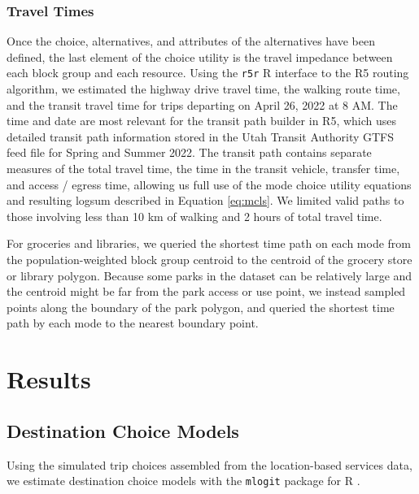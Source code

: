 \documentclass[ijerph,article,submit,moreauthors,pdftex]{mdpi}
\begin{document}
\hypertarget{travel-times}{%
\subsubsection{Travel Times}\label{travel-times}}

Once the choice, alternatives, and attributes of the alternatives have been
defined, the last element of the choice utility is the travel impedance between
each block group and each resource. Using the \texttt{r5r} R interface \citep{r5r} to the R5
routing algorithm, we estimated the highway drive travel time, the walking
route time, and the transit travel time for trips departing on April 26,
2022 at 8 AM. The time and date are most relevant for the transit path builder
in R5, which uses detailed transit path information stored in the
Utah Transit Authority GTFS feed file for Spring and Summer 2022. The transit path contains
separate measures of the total travel time, the time in the transit vehicle,
transfer time, and access / egress time, allowing us full use of the
mode choice utility equations and resulting logsum described in Equation \eqref{eq:mcls}.
We limited valid paths to those involving less than 10 km of walking and
2 hours of total travel time.

For groceries and libraries, we queried the shortest time path on each
mode from the population-weighted block group centroid to the centroid of the grocery
store or library polygon. Because some parks in the dataset can be relatively
large and the centroid might be far from the park access or use point, we instead
sampled points along the boundary of the park polygon, and queried the shortest
time path by each mode to the nearest boundary point.

\hypertarget{results}{%
\section{Results}\label{results}}

\hypertarget{destination-choice-models}{%
\subsection{Destination Choice Models}\label{destination-choice-models}}

Using the simulated trip choices assembled from the location-based services data,
we estimate destination choice models with the \texttt{mlogit} package for
R \citep{R, mlogit}.
\end{document}
